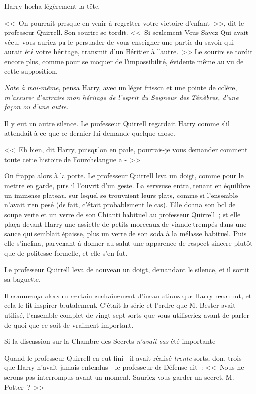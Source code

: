Harry hocha légèrement la tête.

<<~On pourrait presque en venir à regretter votre victoire d'enfant~>>, dit le professeur Quirrell. Son sourire se tordit. <<~Si seulement Vous-Savez-Qui avait vécu, vous auriez pu le persuader de vous enseigner une partie du savoir qui aurait été votre héritage, transmit d'un Héritier à l'autre.~>> Le sourire se tordit encore plus, comme pour se moquer de l'impossibilité, évidente même au vu de cette supposition.

\emph{Note à moi-même}, pensa Harry, avec un léger frisson et une pointe de colère, \emph{m'assurer d'extraire mon héritage de l'esprit du Seigneur des Ténèbres, d'une façon ou d'une autre.}

Il y eut un autre silence. Le professeur Quirrell regardait Harry comme s'il attendait à ce que ce dernier lui demande quelque chose.

<<~Eh bien, dit Harry, puisqu'on en parle, pourrais-je vous demander comment toute cette histoire de Fourchelangue a -~>>

On frappa alors à la porte. Le professeur Quirrell leva un doigt, comme pour le mettre en garde, puis il l'ouvrit d'un geste. La serveuse entra, tenant en équilibre un immense plateau, sur lequel se trouvaient leurs plats, comme si l'ensemble n'avait rien pesé (de fait, c'était probablement le cas). Elle donna son bol de soupe verte et un verre de son Chianti habituel au professeur Quirrell~; et elle plaça devant Harry une assiette de petits morceaux de viande trempés dans une sauce qui semblait épaisse, plus un verre de son soda à la mélasse habituel. Puis elle s'inclina, parvenant à donner au salut une apparence de respect sincère plutôt que de politesse formelle, et elle s'en fut.

Le professeur Quirrell leva de nouveau un doigt, demandant le silence, et il sortit sa baguette.

Il commença alors un certain enchaînement d'incantations que Harry reconnut, et cela le fit inspirer brutalement. C'était la série et l'ordre que M. Bester avait utilisé, l'ensemble complet de vingt-sept sorts que vous utiliseriez avant de parler de quoi que ce soit de vraiment important.

Si la discussion sur la Chambre des Secrets \emph{n'avait pas} été importante -

Quand le professeur Quirrell en eut fini - il avait réalisé \emph{trente} sorts, dont trois que Harry n'avait jamais entendus - le professeur de Défense dit~: <<~Nous ne serons pas interrompus avant un moment. Sauriez-vous garder un secret, M. Potter~?~>>

